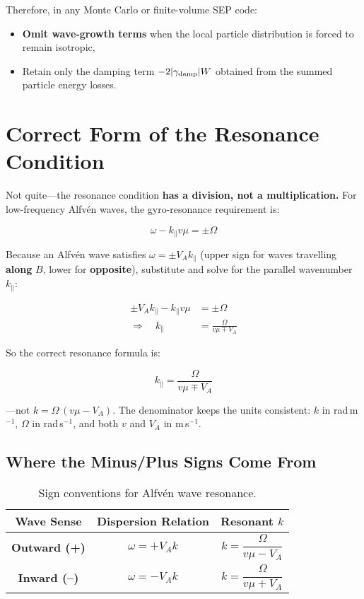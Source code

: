 \medskip

\noindent Therefore, in any Monte Carlo or finite-volume SEP code:
\begin{itemize}
  \item \textbf{Omit wave-growth terms} when the local particle distribution is forced to remain isotropic,
  \item Retain only the damping term $-2|\gamma_{\rm damp}|W$ obtained from the summed particle energy losses.
\end{itemize}

\section*{Correct Form of the Resonance Condition}

Not quite—the resonance condition \textbf{has a division, not a multiplication.}  
For low-frequency Alfvén waves, the gyro-resonance requirement is:

\begin{equation}
\boxed{
\omega - k_\parallel v\mu = \pm\Omega
}
\end{equation}

Because an Alfvén wave satisfies $\omega = \pm V_A k_\parallel$ (upper sign for waves travelling \textbf{along} $B$, lower for \textbf{opposite}), substitute and solve for the parallel wavenumber $k_\parallel$:

\begin{align*}
\pm V_A k_\parallel - k_\parallel v\mu &= \pm\Omega \\
\Longrightarrow\quad k_\parallel &= \frac{\Omega}{v\mu \mp V_A}
\end{align*}

So the correct resonance formula is:

\begin{equation}
\boxed{
k_\parallel = \frac{\Omega}{v\mu \mp V_A}
}
\end{equation}

—not $k = \Omega\, (v\mu - V_A)$.  
The denominator keeps the units consistent: $k$ in rad\,m$^{-1}$, $\Omega$ in rad\,s$^{-1}$, and both $v$ and $V_A$ in m\,s$^{-1}$.

\subsection*{Where the Minus/Plus Signs Come From}

\begin{table}[H]
\centering
\renewcommand{\arraystretch}{1.3}
\begin{tabular}{|c|c|c|}
\hline
\textbf{Wave Sense} & \textbf{Dispersion Relation} & \textbf{Resonant $k$} \\
\hline
\textbf{Outward (+)} & $\omega = +V_A k$ & $k = \dfrac{\Omega}{v\mu - V_A}$ \\
\textbf{Inward (–)}  & $\omega = -V_A k$ & $k = \dfrac{\Omega}{v\mu + V_A}$ \\
\hline
\end{tabular}
\caption{Sign conventions for Alfvén wave resonance.}
\end{table}


